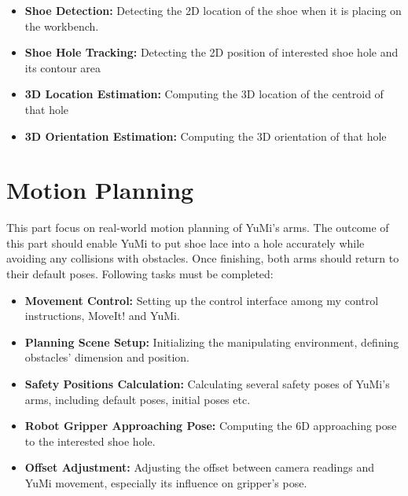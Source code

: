 \begin{itemize}
    \item \textbf{Shoe Detection:} Detecting the 2D location of the shoe when it is placing on the workbench.
    \item \textbf{Shoe Hole Tracking:} Detecting the 2D position of interested shoe hole and its contour area
    \item \textbf{3D Location Estimation:} Computing the 3D location of the centroid of that hole
    \item \textbf{3D Orientation Estimation:} Computing the 3D orientation of that hole
\end{itemize}


\section{Motion Planning}
This part focus on real-world motion planning of YuMi's arms. The outcome of this part should enable YuMi to put shoe lace into a hole accurately while avoiding any collisions with obstacles. Once finishing, both arms should return to their default poses. Following tasks must be completed:

\begin{itemize}
    \item \textbf{Movement Control:} Setting up the control interface among my control instructions, MoveIt! and YuMi.
    \item \textbf{Planning Scene Setup:} Initializing the manipulating environment, defining obstacles' dimension and position.
    \item \textbf{Safety Positions Calculation:} Calculating several safety poses of YuMi's arms, including default poses, initial poses etc.
    \item \textbf{Robot Gripper Approaching Pose:} Computing the 6D approaching pose to the interested shoe hole.
    \item \textbf{Offset Adjustment:} Adjusting the offset between camera readings and YuMi movement, especially its influence on gripper's pose.
\end{itemize}



